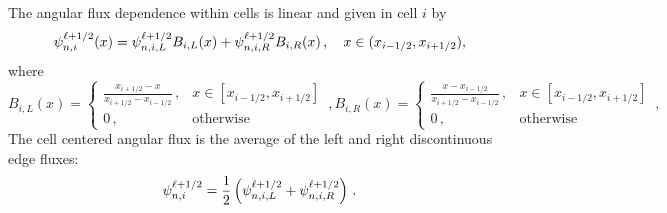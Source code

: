 The angular flux dependence within cells is linear and given in cell $i$ by
\begin{equation} \label{eq:afdef}
\psi_{n,i}^{\ell+1/2}(x) = \psi_{n,i,L}^{\ell+1/2} B_{i,L}(x) + \psi_{n,i,R}^{\ell+1/2} B_{i,R}(x) \,, \quad x \in (x_{i-1/2},x_{i+1/2}),
\end{equation}
where
		\begin{subequations}
		\begin{equation}\label{eq:bfunL}
			B_{i,L}(x) = \begin{cases}
				\frac{x_{i+1/2} - x}{x_{i+1/2} - x_{i-1/2}} \,, & x \in [x_{i-1/2}, x_{i+1/2}] \\ 
				0 \,, & \text{otherwise}
			\end{cases} \,,
		\end{equation}
		\begin{equation}\label{eq:bfunR}
			B_{i,R}(x) = \begin{cases}
				\frac{x - x_{i-1/2}}{x_{i+1/2} - x_{i-1/2}} \,, & x \in [x_{i-1/2}, x_{i+1/2}] \\ 
				0 \,, & \text{otherwise}
			\end{cases} \,,
		\end{equation}
	\end{subequations}
The cell centered angular flux is the average of the left and right discontinuous edge fluxes:
	\begin{equation} \label{eq:lldg_i}
		\psi_{n,i}^{\ell+1/2} = \frac{1}{2}\left(\psi_{n,i,L}^{\ell+1/2} + \psi_{n,i,R}^{\ell+1/2}\right) \,.
	\end{equation}

